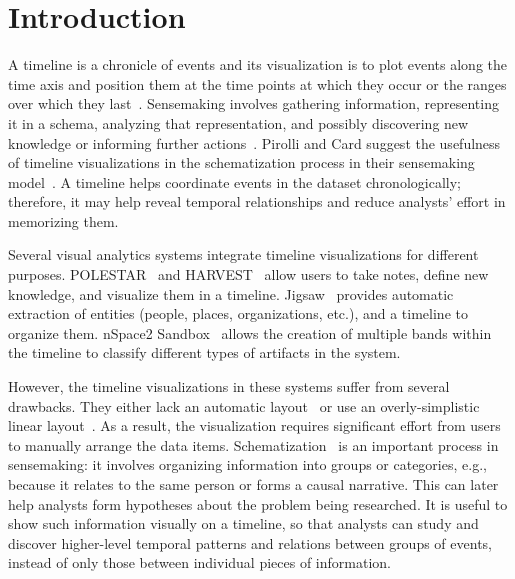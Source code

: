 \section{Introduction}
\label{sec:intro}

A timeline is a chronicle of events and its visualization is to plot events along the time axis and position them at the time points at which they occur or the ranges over which they last~\cite{Plaisant1996a}. 
Sensemaking involves gathering information, representing it in a schema, analyzing that representation, and possibly discovering new knowledge or informing further actions~\cite{Card1999}. 
Pirolli and Card suggest the usefulness of timeline visualizations in the schematization process in their sensemaking model~\cite{Pirolli2005}. A timeline helps coordinate events in the dataset chronologically; therefore, it may help reveal temporal relationships and reduce analysts' effort in memorizing them.

 Several visual analytics systems integrate timeline visualizations for different purposes. POLESTAR~\cite{Pioch2006} and HARVEST~\cite{Gotz2006} allow users to take notes, define new knowledge, and visualize them in a timeline. Jigsaw~\cite{Gorg2013} provides automatic extraction of entities (people, places, organizations, etc.), and a timeline to organize them. nSpace2 Sandbox~\cite{SandboxTimeline2012} allows the creation of multiple bands within the timeline to classify different types of artifacts in the system.

However, the timeline visualizations in these systems suffer from several drawbacks. They either lack an automatic layout~\cite{Pioch2006} or use an overly-simplistic linear layout~\cite{SandboxTimeline2012}. As a result, the visualization requires significant effort from users to manually arrange the data items.  
Schematization~\cite{Pirolli2005} is an important process in sensemaking: it involves organizing information into groups or categories, e.g., because it relates to the same person or forms a causal narrative. This can later help analysts form hypotheses about the problem being researched. It is useful to show such information visually on a timeline, so that analysts can study and discover higher-level temporal patterns and relations between groups of events, instead of only those between individual pieces of information. 

